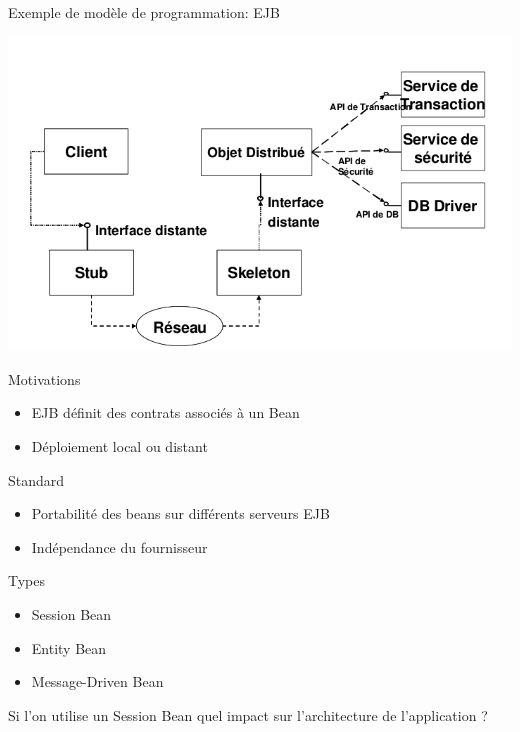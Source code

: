 
\begin{frame}{Exemple de modèle de programmation: EJB}
  \begin{center}
    \includegraphics[scale=0.3]{img/ejb-overview.png}
  \end{center}
\end{frame}


\begin{frame}
  \begin{block}{Motivations}
    \begin{itemize}
      \item EJB définit des contrats associés à un Bean
      \item Déploiement local ou distant
    \end{itemize}
  \end{block}

  \begin{block}{Standard}
     \begin{itemize}
       \item Portabilité des beans sur différents serveurs EJB
       \item Indépendance du fournisseur
    \end{itemize}
  \end{block}
\end{frame}

\begin{frame}
  \begin{block}{Types}
    \begin{itemize}
      \item Session Bean
      \item Entity Bean
      \item Message-Driven Bean
    \end{itemize}
  \end{block}

  \begin{center}
    Si l'on utilise un Session Bean quel impact sur l'architecture de l'application ?
  \end{center}

\end{frame}
